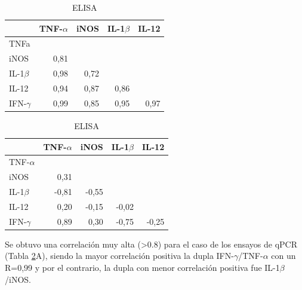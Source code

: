 \documentclass[12pt,letterpaper,oneside]{scrbook}
\begin{document}
\begin{table}[h!]
\centering
\caption[Matrices de correlación de las moléculas en estudio]{Matrices de correlación de las moléculas en estudio, para qPCR y ELISA}\label{tab:corr}
\begin{subtable}{.5\textwidth}
\centering

\begin{tabular}{lrrrr}
\toprule
   & TNF-$\alpha$ & iNOS & IL-1$\beta$ & IL-12 \\ 
  \midrule
TNFa &  &  &  &  \\ 
  iNOS &  {\color{OliveGreen}0,81}  &  &  &  \\ 
  IL-1$\beta$ &  {\color{OliveGreen}0,98}  &  0,72  &  &  \\ 
  IL-12 &  {\color{OliveGreen}0,94}  &  {\color{OliveGreen}0,87}  &  {\color{OliveGreen}0,86}  &  \\ 
  IFN-$\gamma$ &  {\color{OliveGreen}0,99} &  {\color{OliveGreen}0,85}  &  {\color{OliveGreen}0,95}  &  {\color{OliveGreen}0,97}  \\ 
   \bottomrule
   \end{tabular}

\caption{qPCR}
\end{subtable}%
\begin{subtable}{.5\textwidth}
\centering

\begin{tabular}{lrrrr}
\toprule
        & TNF-$\alpha$ & iNOS & IL-1$\beta$ & IL-12 \\ 
  \midrule
  TNF-$\alpha$ & & & & \\
  iNOS &  0,31  &  &  &  \\ 
  IL-1$\beta$ & {\color{red}-0,81}  & -0,55  &  &  \\ 
  IL-12 &  0,20  & -0,15  & -0,02  &  \\ 
  IFN-$\gamma$ &  {\color{OliveGreen}0,89}  &  0,30  & -0,75  & -0,25  \\ 
   \bottomrule
   \end{tabular}

\caption{ELISA}
\end{subtable}
\end{table}

Se obtuvo una correlación muy alta (\textgreater{}0.8) para el caso de
los ensayos de qPCR (Tabla \ref{tab:corr}A), siendo la mayor correlación
positiva la dupla IFN-\(\gamma\)/TNF-\(\alpha\) con un R=0,99 y por el
contrario, la dupla con menor correlación positiva fue
IL-1\(\beta\)/iNOS.
\end{document}
